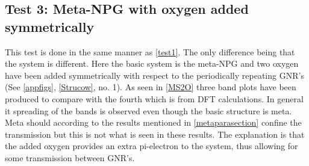 \subsection{Test 3: Meta-NPG with oxygen added symmetrically}\label{test3}
This test is done in the same manner as \cref{test1}. The only difference being that the system is different. Here the basic system is the meta-NPG and two oxygen have been added symmetrically with respect to the periodically repeating GNR's (See \cref{appfigs}, \cref{Strucow}, no. 1). As seen in \cref{MS2O} three band plots have been produced to compare with the fourth which is from DFT calculations. In general it spreading of the bands is observed even though the basic structure is meta. Meta should according to the results mentioned in \cref{metaparasection} confine the transmission but this is not what is seen in these results. The explanation is that the added oxygen provides an extra pi-electron to the system, thus allowing for some transmission between GNR's.
